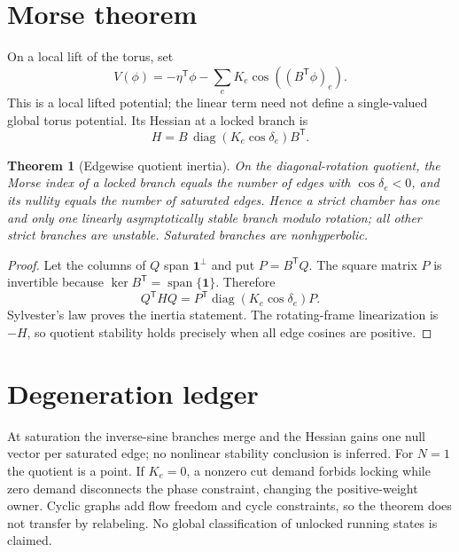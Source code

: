 \documentclass[10pt]{article}
\newtheorem{theorem}{Theorem}
\newcommand{\one}{\mathbf 1}
\begin{document}
\section{Morse theorem}
On a local lift of the torus, set
\begin{equation}
 V(\phi)=-\eta^{\mathsf T}\phi-\sum_e K_e
              \cos((B^{\mathsf T}\phi)_e).
\end{equation}
This is a local lifted potential; the linear term need not define a
single-valued global torus potential.  Its Hessian at a locked branch is
\begin{equation}
 H=B\,\operatorname{diag}(K_e\cos\delta_e)B^{\mathsf T}.
\end{equation}
\begin{theorem}[Edgewise quotient inertia]
On the diagonal-rotation quotient, the Morse index of a locked branch equals
the number of edges with $\cos\delta_e<0$, and its nullity equals the number
of saturated edges.  Hence a strict chamber has one and only one linearly
asymptotically stable branch modulo rotation; all other strict branches are
unstable.  Saturated branches are nonhyperbolic.
\end{theorem}
\begin{proof}
Let the columns of $Q$ span $\one^\perp$ and put $P=B^{\mathsf T}Q$.  The
square matrix $P$ is invertible because
$\ker B^{\mathsf T}=\operatorname{span}\{\one\}$.  Therefore
\begin{equation}
 Q^{\mathsf T}HQ=P^{\mathsf T}
 \operatorname{diag}(K_e\cos\delta_e)P.
\end{equation}
Sylvester's law proves the inertia statement.  The rotating-frame
linearization is $-H$, so quotient stability holds precisely when all edge
cosines are positive.
\end{proof}

\section{Degeneration ledger}
At saturation the inverse-sine branches merge and the Hessian gains one null vector
per saturated edge; no nonlinear stability conclusion is inferred.  For
$N=1$ the quotient is a point.  If $K_e=0$, a nonzero cut demand forbids
locking while zero demand disconnects the phase constraint, changing the
positive-weight owner.  Cyclic graphs add flow freedom and cycle constraints,
so the theorem does not transfer by relabeling.  No global classification of
unlocked running states is claimed.
\end{document}
